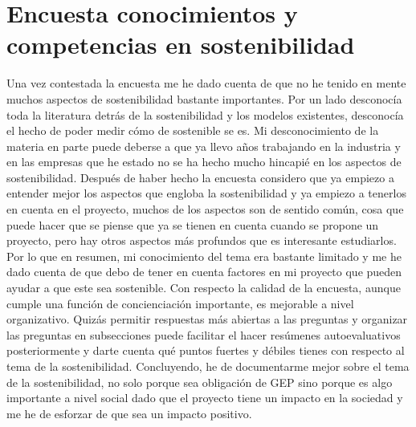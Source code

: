 \chapter{Encuesta conocimientos y competencias en sostenibilidad}
Una vez contestada la encuesta me he dado cuenta de que no he tenido en mente muchos aspectos de sostenibilidad bastante importantes. Por un lado desconocía toda la literatura detrás de la sostenibilidad y los modelos existentes, desconocía el hecho de poder medir cómo de sostenible se es. Mi desconocimiento de la materia en parte puede deberse a que ya llevo años trabajando en la industria y en las empresas que he estado no se ha hecho mucho hincapié en los aspectos de sostenibilidad. Después de haber hecho la encuesta considero que ya empiezo a entender mejor los aspectos que engloba la sostenibilidad y ya empiezo a tenerlos en cuenta en el proyecto, muchos de los aspectos son de sentido común, cosa que puede hacer que se piense que ya se tienen en cuenta cuando se propone un proyecto, pero hay otros aspectos más profundos que es interesante estudiarlos. Por lo que en resumen, mi conocimiento del tema era bastante limitado y me he dado cuenta de que debo de tener en cuenta factores en mi proyecto que pueden ayudar a que este sea sostenible.
Con respecto la calidad de la encuesta, aunque cumple una función de concienciación importante, es mejorable a nivel organizativo. Quizás permitir respuestas más abiertas a las preguntas y organizar las preguntas en subsecciones puede facilitar el hacer resúmenes autoevaluativos posteriormente y darte cuenta qué puntos fuertes y débiles tienes con respecto al tema de la sostenibilidad.
Concluyendo, he de documentarme mejor sobre el tema de la sostenibilidad, no solo porque sea obligación de GEP sino porque es algo importante a nivel social dado que el proyecto tiene un impacto en la sociedad y me he de esforzar de que sea un impacto positivo.